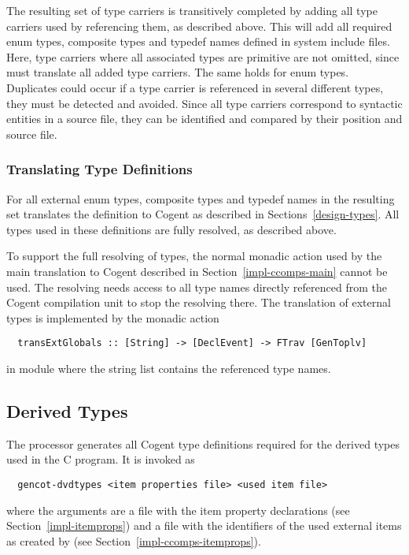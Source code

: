 The resulting set of type carriers is transitively completed by adding all type carriers used by referencing them,
as described above. This will add all required enum types, composite types and typedef names defined in system include files.
Here, type carriers where all associated types are primitive are not omitted, since 
 must translate all added type carriers. The same holds for enum types. 
Duplicates could occur if a type carrier is referenced
in several different types, they must be detected and avoided. Since all type carriers correspond to 
syntactic entities in a source file, they can be identified and compared by their position and source file.

\subsubsection{Translating Type Definitions}

For all external enum types, composite types and typedef names in the resulting set  translates the
definition to Cogent as described in Sections~\ref{design-types}.
All types used in these definitions are fully resolved, as described above.

To support the full resolving of types, the normal monadic action  used by the main translation 
to Cogent described in Section~\ref{impl-ccomps-main} cannot be used. The resolving needs access to all
type names directly referenced from the Cogent compilation unit to stop the resolving there.
The translation of external types is implemented by the monadic action 
\begin{verbatim}
  transExtGlobals :: [String] -> [DeclEvent] -> FTrav [GenToplv]
\end{verbatim}
in module  where the string list contains the referenced type names.

\subsection{Derived Types}
\label{impl-ccomps-dvdtypes}

The processor  generates all Cogent type definitions required for the derived types
used in the C program. It is invoked as
\begin{verbatim}
  gencot-dvdtypes <item properties file> <used item file>
\end{verbatim}
where the arguments are a file with the item property declarations (see 
Section~\ref{impl-itemprops}) and a file with the identifiers of the used external items as created 
by  (see Section~\ref{impl-ccomps-itemprops}).

